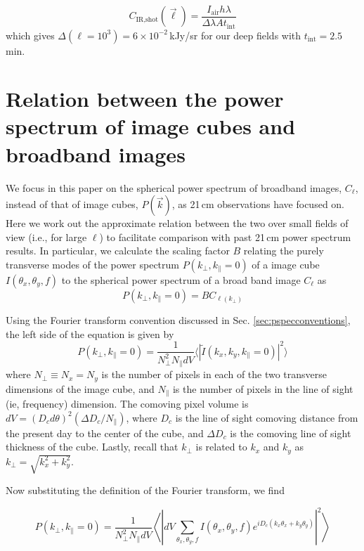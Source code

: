\documentclass[numberedappendix]{emulateapj}
\newcommand{\IR}{\text{IR}}
\newcommand{\shot}{\text{shot}}
\begin{document}
\begin{equation}
C_{\IR, \shot}(\vec{\ell}) =\frac{I_\text{air}h\lambda}{\Delta \lambda A t_\text{int}}
\end{equation}
which gives $\Delta(\ell=10^3)=6\times10^{-2}$\,kJy/sr for our deep fields with $t_\text{int}=2.5$\,min. %

\section{Relation between the power spectrum of image cubes and broadband images}
\label{sec:pspecrelation}

We focus in this paper on the spherical power spectrum of broadband images, $C_\ell$,  instead of that of image cubes, $P(\vec{k})$, as 21\,cm observations have focused on. Here we work out the approximate relation between the two over small fields of view (i.e., for large $\ell$) to facilitate comparison with past 21\,cm power spectrum results. In particular, we calculate the scaling factor $B$ relating the purely transverse modes of the power spectrum $P(k_\perp,k_\parallel=0)$ of a image cube $I(\theta_x,\theta_y,f)$ to the spherical power spectrum of a broad band image $C_\ell$ as
\begin{equation}
P(k_\perp,k_\parallel=0) = B C_{\ell(k_\perp)}
\end{equation}

Using the Fourier transform convention discussed in Sec. \ref{sec:pspecconventions}, the left side of the equation is given by
\begin{equation}
P(k_\perp,k_\parallel=0) = \frac{1}{N_\perp^2 N_\parallel dV}\langle|\tilde{I}(k_x,k_y,k_\parallel=0)|^2\rangle
\end{equation}
where $N_\perp\equiv N_x=N_y$ is the number of pixels in each of the two transverse dimensions of the image cube, and $N_\parallel$ is the number of pixels in the line of sight (ie, frequency) dimension. The comoving pixel volume is $dV = (D_c d\theta)^2 (\Delta D_c/N_\parallel)$, where $D_c$ is the line of sight comoving distance from the present day to the center of the cube, and $\Delta D_c$ is the comoving line of sight thickness of the cube. Lastly, recall that $k_\perp$ is related to $k_x$ and $k_y$ as $k_\perp=\sqrt{k_x^2+k_y^2}$.

Now substituting the definition of the Fourier transform, we find

\begin{equation}
P(k_\perp,k_\parallel=0) =\frac{1}{N_\perp^2 N_\parallel dV}\left\langle\left|dV\sum_{\theta_x,\theta_y,f}I(\theta_x,\theta_y,f)e^{iD_c(k_x\theta_x+k_y\theta_y)}\right|^2\right\rangle
\end{equation}
\end{document}
